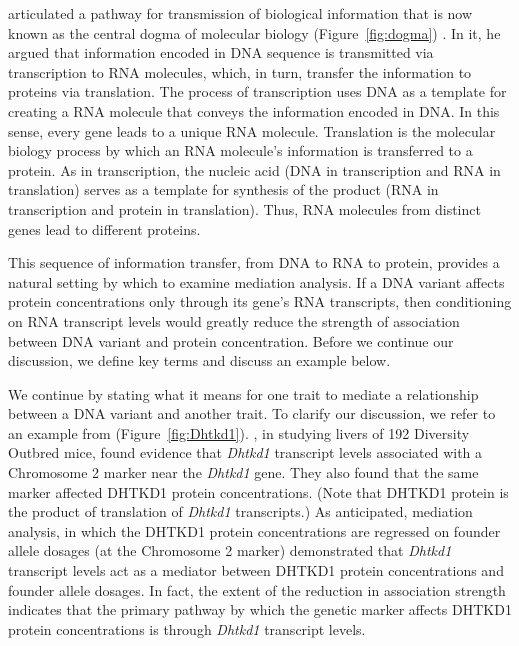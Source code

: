 \documentclass[oneside]{book}\usepackage[]{graphicx}\usepackage[]{color}
\begin{document}
\citet{crick1958protein} articulated a pathway for transmission of biological information  
that is now known as the central dogma of molecular biology (Figure~\ref{fig:dogma}) 
\citep{crick1970central}. 
In it, he argued that information encoded in DNA sequence is transmitted via transcription 
to 
RNA molecules, which, in turn, transfer the information to proteins via translation. 
The process of transcription uses DNA as a template for creating a RNA molecule that 
conveys the information encoded in DNA. 
In this sense, every gene leads to a unique RNA molecule. 
Translation is the molecular biology process by which an RNA molecule's information is 
transferred to a protein. 
As in transcription, the nucleic acid (DNA in transcription and RNA in translation) serves 
as a template for synthesis of the product (RNA in transcription and protein in translation). 
Thus, RNA molecules from distinct genes lead to different proteins.

This sequence of information transfer, from DNA to RNA to protein, provides a natural 
setting by which to examine mediation analysis. If a DNA variant affects protein 
concentrations only through its gene's RNA transcripts, then conditioning on RNA transcript 
levels would greatly reduce the strength of association between DNA variant and protein 
concentration. Before we continue our discussion, we define key terms and discuss an 
example below. 

We continue by stating what it means for one trait to mediate a relationship between a 
DNA variant and another trait. To clarify our discussion, we refer to an example from 
\citet{chick2016defining} (Figure~\ref{fig:Dhtkd1}). \citet{chick2016defining}, in 
studying livers of 192 Diversity Outbred mice, found evidence that \emph{Dhtkd1} 
transcript levels associated with a Chromosome 2 marker near the \emph{Dhtkd1} gene. 
They also found that 
the same marker affected DHTKD1 protein concentrations. (Note that DHTKD1 protein is the 
product of translation of \emph{Dhtkd1} transcripts.)
As anticipated, mediation analysis, in which the DHTKD1 protein concentrations are
regressed on founder allele dosages (at the Chromosome 2 marker) demonstrated that
\emph{Dhtkd1} transcript levels act as a mediator between DHTKD1 protein concentrations 
and founder allele dosages. In fact, the extent of the reduction in association 
strength indicates that the primary pathway by which the genetic marker affects DHTKD1 
protein concentrations is through \emph{Dhtkd1} transcript levels.
\end{document}
